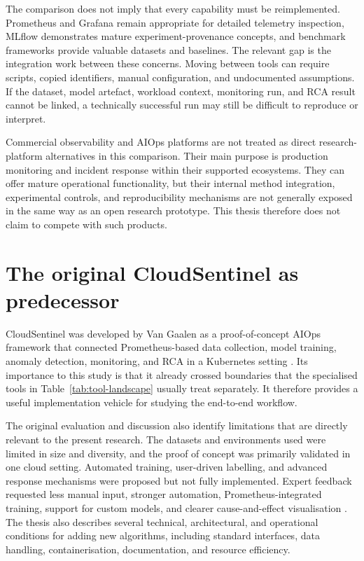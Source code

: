 The comparison does not imply that every capability must be reimplemented. Prometheus and Grafana remain appropriate for detailed telemetry inspection, MLflow demonstrates mature experiment-provenance concepts, and benchmark frameworks provide valuable datasets and baselines. The relevant gap is the integration work between these concerns. Moving between tools can require scripts, copied identifiers, manual configuration, and undocumented assumptions. If the dataset, model artefact, workload context, monitoring run, and RCA result cannot be linked, a technically successful run may still be difficult to reproduce or interpret.

Commercial observability and AIOps platforms are not treated as direct research-platform alternatives in this comparison. Their main purpose is production monitoring and incident response within their supported ecosystems. They can offer mature operational functionality, but their internal method integration, experimental controls, and reproducibility mechanisms are not generally exposed in the same way as an open research prototype. This thesis therefore does not claim to compete with such products.

\section{The original CloudSentinel as predecessor}

CloudSentinel was developed by Van Gaalen as a proof-of-concept AIOps framework that connected Prometheus-based data collection, model training, anomaly detection, monitoring, and RCA in a Kubernetes setting \parencite{vangaalen2024cloudsentinel}. Its importance to this study is that it already crossed boundaries that the specialised tools in Table~\ref{tab:tool-landscape} usually treat separately. It therefore provides a useful implementation vehicle for studying the end-to-end workflow.

The original evaluation and discussion also identify limitations that are directly relevant to the present research. The datasets and environments used were limited in size and diversity, and the proof of concept was primarily validated in one cloud setting. Automated training, user-driven labelling, and advanced response mechanisms were proposed but not fully implemented. Expert feedback requested less manual input, stronger automation, Prometheus-integrated training, support for custom models, and clearer cause-and-effect visualisation \parencite{vangaalen2024cloudsentinel}. The thesis also describes several technical, architectural, and operational conditions for adding new algorithms, including standard interfaces, data handling, containerisation, documentation, and resource efficiency.

